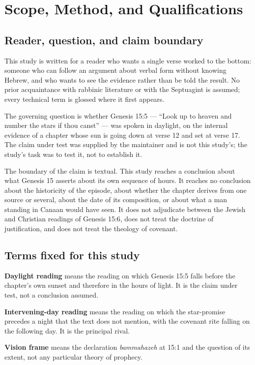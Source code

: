 \section{Scope, Method, and Qualifications}

\subsection{Reader, question, and claim boundary}

This study is written for a reader who wants a single verse worked to the
bottom: someone who can follow an argument about verbal form without knowing
Hebrew, and who wants to see the evidence rather than be told the result. No
prior acquaintance with rabbinic literature or with the Septuagint is assumed;
every technical term is glossed where it first appears.

The governing question is whether Genesis 15:5 --- ``Look up to heaven and
number the stars if thou canst'' --- was spoken in daylight, on the internal
evidence of a chapter whose sun is going down at verse 12 and set at verse 17.
The claim under test was supplied by the maintainer and is not this study's; the
study's task was to test it, not to establish it.

The boundary of the claim is textual. This study reaches a conclusion about what
Genesis 15 asserts about its own sequence of hours. It reaches no conclusion
about the historicity of the episode, about whether the chapter derives from one
source or several, about the date of its composition, or about what a man
standing in Canaan would have seen. It does not adjudicate between the Jewish
and Christian readings of Genesis 15:6, does not treat the doctrine of
justification, and does not treat the theology of covenant.

\subsection{Terms fixed for this study}

\textbf{Daylight reading} means the reading on which Genesis 15:5 falls before
the chapter's own sunset and therefore in the hours of light. It is the claim
under test, not a conclusion assumed.

\textbf{Intervening-day reading} means the reading on which the star-promise
precedes a night that the text does not mention, with the covenant rite falling
on the following day. It is the principal rival.

\textbf{Vision frame} means the declaration \textit{bammahazeh} at 15:1 and the
question of its extent, not any particular theory of prophecy.

